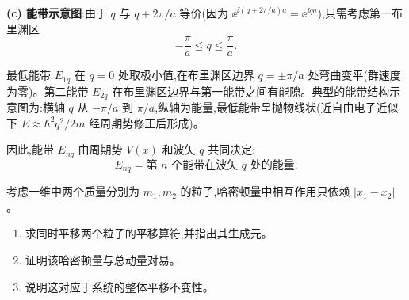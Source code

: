 \begin{solution}
	\textbf{(c) 能带示意图}:由于 $q$ 与 $q+2\pi/a$ 等价(因为 $\ee^{\ii (q+2\pi/a)a}=\ee^{\ii qa}$),只需考虑第一布里渊区
	\[
	-\frac{\pi}{a}\le q\le\frac{\pi}{a}.
	\]

	最低能带 $E_{1q}$ 在 $q=0$ 处取极小值,在布里渊区边界 $q=\pm\pi/a$ 处弯曲变平(群速度为零)。第二能带 $E_{2q}$ 在布里渊区边界与第一能带之间有能隙。典型的能带结构示意图为:横轴 $q$ 从 $-\pi/a$ 到 $\pi/a$,纵轴为能量,最低能带呈抛物线状(近自由电子近似下 $E\approx\hbar^2q^2/2m$ 经周期势修正后形成)。

	因此,能带 $E_{nq}$ 由周期势 $V(x)$ 和波矢 $q$ 共同决定:
	\[
	\boxed{E_{nq}=\text{第 }n\text{ 个能带在波矢 }q\text{ 处的能量}}.
	\]
	\end{solution}

\begin{question}
考虑一维中两个质量分别为 $m_1,m_2$ 的粒子,哈密顿量中相互作用只依赖 $|x_1-x_2|$。
\begin{enumerate}
\item 求同时平移两个粒子的平移算符,并指出其生成元。
\item 证明该哈密顿量与总动量对易。
\item 说明这对应于系统的整体平移不变性。
\end{enumerate}
\end{question}

